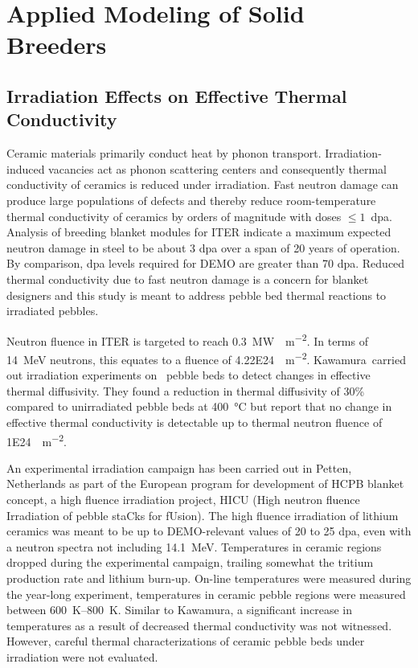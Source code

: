 \chapter{Applied Modeling of Solid Breeders}\label{sec:dem-studies}




\section{Irradiation Effects on Effective Thermal Conductivity}\label{sec:irradiation}
Ceramic materials primarily conduct heat by phonon transport. Irradiation-induced vacancies act as phonon scattering centers and consequently thermal conductivity of ceramics is reduced under irradiation.\cite{Hopkins1985} Fast neutron damage can produce large populations of defects and thereby reduce room-temperature thermal conductivity of ceramics by orders of magnitude with doses $\le 1$~dpa.\cite{Snead2005} Analysis of breeding blanket modules for ITER indicate a maximum expected neutron damage in steel to be about 3 dpa over a span of 20 years of operation. By comparison, dpa levels required for DEMO are greater than 70 dpa.\cite{Giancarli2006a} Reduced thermal conductivity due to fast neutron damage is a concern for blanket designers and this study is meant to address pebble bed thermal reactions to irradiated pebbles.

Neutron fluence in ITER is targeted to reach \SI{0.3}{\mega\watt\year\per\square\meter}.\cite{Abdou2015,VanHoutte2011} In terms of \SI{14}{\mega\electronvolt} neutrons, this equates to a fluence of \SI{4.22E24}{\neutron\per\meter\squared}. Kawamura\etal~carried out irradiation experiments on \lit~pebble beds to detect changes in effective thermal diffusivity. They found a reduction in thermal diffusivity of 30\% compared to unirradiated pebble beds at \SI{400}{\celsius} but report that no change in effective thermal conductivity is detectable up to thermal neutron fluence of \SI{1E24}{\neutron\per\meter\squared}. 

An experimental irradiation campaign has been carried out in Petten, Netherlands as part of the European program for development of HCPB blanket concept, a high fluence irradiation project, HICU (High neutron fluence Irradiation of pebble staCks for fUsion). The high fluence irradiation of lithium ceramics was meant to be up to DEMO-relevant values of 20 to 25 dpa, even with a neutron spectra not including \SI{14.1}{\mega\electronvolt}.\cite{Hegeman2003,VanTil2012} Temperatures in ceramic regions dropped during the experimental campaign, trailing somewhat the tritium production rate and lithium burn-up. On-line temperatures were measured during the year-long experiment, temperatures in ceramic pebble regions were measured between \SIrange{600}{800}{\kelvin}. Similar to Kawamura\etal, a significant increase in temperatures as a result of decreased thermal conductivity was not witnessed. However, careful thermal characterizations of ceramic pebble beds under irradiation were not evaluated.

